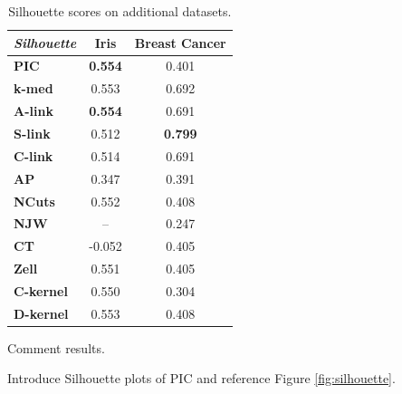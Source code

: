 \begin{table}[h]
    \centering
    \begin{tabular}{|l|c|c|}
        \hline
        \textit{Silhouette} & \textbf{Iris} & \textbf{Breast Cancer} \\
        \hline
        \textbf{PIC}       & \textbf{0.554} & 0.401 \\ \hline
        \textbf{k-med}     & 0.553 & 0.692 \\ \hline
        \textbf{A-link}    & \textbf{0.554} & 0.691 \\ \hline
        \textbf{S-link}    & 0.512 & \textbf{0.799} \\ \hline
        \textbf{C-link}    & 0.514 & 0.691 \\ \hline
        \textbf{AP}        & 0.347 & 0.391 \\ \hline
        \textbf{NCuts}     & 0.552 & 0.408 \\ \hline
        \textbf{NJW}       & -- & 0.247 \\ \hline
        \textbf{CT}        & -0.052 & 0.405 \\ \hline
        \textbf{Zell}      & 0.551 & 0.405 \\ \hline
        \textbf{C-kernel}  & 0.550 & 0.304 \\ \hline
        \textbf{D-kernel}  & 0.553 & 0.408 \\
        \hline
        \end{tabular}
    \caption{Silhouette scores on additional datasets.}
    \label{table:silhouette_additional}
\end{table}

Comment results.

Introduce Silhouette plots of PIC and reference Figure \ref{fig:silhouette}.

